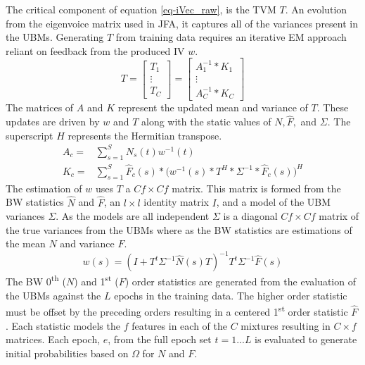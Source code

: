 The critical component of equation \ref{eq-iVec_raw}, is the \ac{TVM} $T$. An evolution from the eigenvoice matrix used in \ac{JFA}, it captures all of the variances present in the \acp{UBM}. Generating $T$ from training data requires an iterative \ac{EM} approach reliant on feedback from the produced \ac{IV} $w$.
\begin{equation}
T = \begin{bmatrix} T_{1} \\ \vdots \\ T_{C}\end{bmatrix} =
\begin{bmatrix} A_{1}^{-1}*K_{1} \\ \vdots \\ A_{C}^{-1}*K_{C}\end{bmatrix}
\label{eq-finalT}
\end{equation}
The matrices of $A$ and $K$ represent the updated mean and variance of $T$. These updates are driven by $w$ and $T$ along with the static values of $N, \hat{F},$ and $\Sigma$. The superscript $H$ represents the Hermitian transpose.
\begin{align}
A_{c} =& \sum_{s=1}^{S}N_{s}(t)w^{-1}(t) \\
K_{c} =& \sum_{s=1}^{S}\hat{F}_{c}(s)*\big(w^{-1}(s)*T^{H}*\Sigma^{-1}*\hat{F}_{c}(s) \big)^{H}
\end{align}
The estimation of $w$ uses $T$ a $Cf \times Cf$ matrix. This matrix is formed from the \ac{BW} statistics $\hat{N}$ and $\hat{F}$, an $l \times l$ identity matrix $I$, and a model of the \ac{UBM} variances $\Sigma$. As the models are all independent $\Sigma$ is a diagonal $Cf \times Cf$ matrix of the true variances from the \acp{UBM} where as the \ac{BW} statistics are estimations of the mean $N$ and variance $F$.
\begin{equation}
w(s) = \left(I + T^{t}\Sigma^{-1}\hat{N}(s)T \right)^{-1} T^{t}\Sigma^{-1}\hat{F}(s)
\label{eq-fakeI}
\end{equation}
The \ac{BW} 0\textsuperscript{th} ($N$) and 1\textsuperscript{st} ($F$) order statistics are generated from the evaluation of the \acp{UBM} against the $L$ epochs in the training data. The higher order statistic must be offset by the preceding orders resulting in a centered 1\textsuperscript{st} order statistic $\hat{F}$. Each statistic models the $f$ features in each of the $C$ mixtures resulting in $C\times f$ matrices. Each epoch, $e$, from the full epoch set $t=1...L$ is evaluated to generate initial probabilities based on $\Omega$ for $N$ and $F$.
